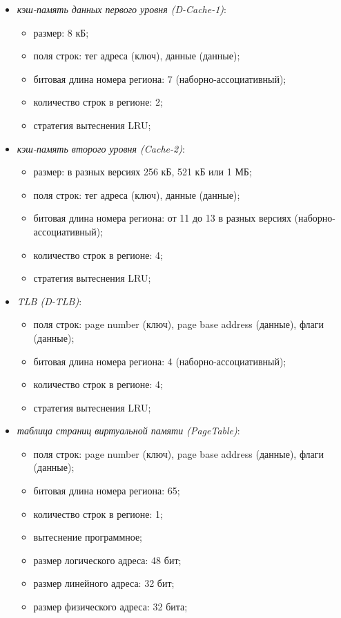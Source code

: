 \documentclass[14pt]{extreport}
\newcommand{\LRU}{\textsf{LRU}\xspace}
\begin{document}
\begin{itemize}
  \item \emph{кэш-память данных первого уровня (D-Cache-1)}:
        \begin{itemize}
            \item размер: 8 кБ;
            \item поля строк: тег адреса (ключ), данные (данные);
            \item битовая длина номера региона: 7 (наборно-ассоциативный);
            \item количество строк в регионе: 2;
            \item стратегия вытеснения \LRU;
        \end{itemize}

  \item \emph{кэш-память второго уровня (Cache-2)}:
        \begin{itemize}
            \item размер: в разных версиях 256 кБ, 521 кБ или 1 МБ;
            \item поля строк: тег адреса (ключ), данные (данные);
            \item битовая длина номера региона: от 11 до 13 в разных версиях (наборно-ассоциативный);
            \item количество строк в регионе: 4;
            \item стратегия вытеснения \LRU;
        \end{itemize}

  \item \emph{TLB (D-TLB)}:
        \begin{itemize}
            \item поля строк: page number (ключ), page base address (данные), флаги (данные);
            \item битовая длина номера региона: 4 (наборно-ассоциативный);
            \item количество строк в регионе: 4;
            \item стратегия вытеснения \LRU;
        \end{itemize}

  \item \emph{таблица страниц виртуальной памяти (PageTable)}:
    \begin{itemize}
        \item поля строк: page number (ключ), page base address (данные), флаги (данные);
        \item битовая длина номера региона: 65;
        \item количество строк в регионе: 1;
        \item вытеснение программное;
        \item размер логического адреса: 48 бит;
        \item размер линейного адреса: 32 бит;
        \item размер физического адреса: 32 бита;
    \end{itemize}



\end{itemize}
\end{document}
